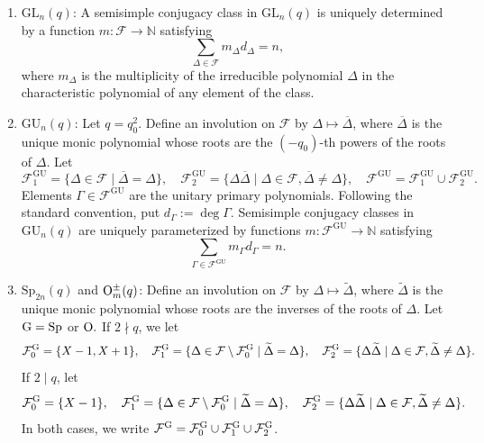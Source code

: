 \documentclass[12pt]{amsart}
\numberwithin{itemcounter}{subsection}
\theoremstyle{plain}
\theoremstyle{definition}
\theoremstyle{remark}
\numberwithin{equation}{section}
\def\bbN{\mathbb{N}}
\def\calF{\mathcal{F}}
\def\Sp{\mathrm{Sp}}
\def\GL{\mathrm{GL}}
\def\GU{\mathrm{GU}}
\begin{document}
	\begin{enumerate}
		\item \textbf{$\GL_n(q)$}:
		A semisimple conjugacy class in $\GL_n(q)$ is uniquely determined by a function
		$m:\calF\to\bbN$ satisfying
		\[
		\sum_{\Delta\in\calF}m_\Delta d_\Delta=n,
		\]
		where $m_\Delta$ is the multiplicity of the irreducible polynomial $\Delta$ in the
		characteristic polynomial of any element of the class.

		\item \textbf{$\GU_n(q)$}:
		Let $q = q_0^2$. Define an involution on $\calF$ by $\Delta \mapsto \overline{\Delta}$, where $\overline{\Delta}$ is the unique monic polynomial whose roots are the $(-q_0)$-th powers of the roots of $\Delta$. Let
		\[
		\calF^{\GU}_1 = \{ \Delta \in \calF \mid \overline{\Delta} = \Delta \}, \quad
		\calF^{\GU}_2 = \{ \Delta \overline{\Delta} \mid \Delta \in \calF, \overline{\Delta} \neq \Delta \}, \quad
		\calF^{\GU} = \calF^{\GU}_1 \cup \calF^{\GU}_2.
		\]
		Elements $\Gamma\in\calF^{\GU}$ are the unitary primary polynomials.  Following the standard convention, put $d_\Gamma:=\deg\Gamma$.
		Semisimple conjugacy classes in $\GU_n(q)$ are uniquely parameterized by
		functions $m:\calF^{\GU}\to\bbN$ satisfying
		\[
		\sum_{\Gamma\in\calF^{\GU}}m_\Gamma d_\Gamma=n.
		\]

		\item {$\Sp_{2n}(q)$ and ${\rm O}^{\pm}_m(q)$}:
		Define an involution on $\calF$ by $\Delta \mapsto \widetilde{\Delta}$, where $\widetilde{\Delta}$ is the unique monic polynomial whose roots are the inverses of the roots of $\Delta$.
        Let $\rm G=\Sp$ or $\rm O.$
        If $2\nmid q$, we let
		\[
		\calF^{\rm G}_0 = \{ X-1, X+1 \}, \quad
		\calF^{\rm G}_1 = \{ \Delta \in \calF \setminus \calF^{\rm G}_0 \mid \widetilde{\Delta} = \Delta \}, \quad
		\calF^{\rm G}_2 = \{ \Delta \widetilde{\Delta} \mid \Delta \in \calF, \widetilde{\Delta} \neq \Delta \}.
		\]
        If $2\mid q$, let
		\[
		\calF^{\rm G}_0 = \{ X-1\}, \quad
		\calF^{\rm G}_1 = \{ \Delta \in \calF \setminus \calF^{\rm G}_0 \mid \widetilde{\Delta} = \Delta \}, \quad
		\calF^{\rm G}_2 = \{ \Delta \widetilde{\Delta} \mid \Delta \in \calF, \widetilde{\Delta} \neq \Delta \}.
		\]
        In both cases, we write $\calF^{\rm G}=\calF^{\rm G}_0\cup\calF^{\rm G}_1\cup\calF^{\rm G}_2$.


\end{enumerate}
\end{document}
